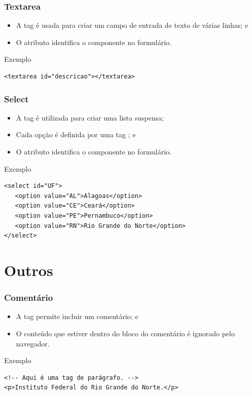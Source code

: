 \documentclass[aspectratio=169]{beamer} %
\begin{document}
\begin{frame}[fragile]
	\frametitle{Textarea}
	
	\begin{itemize}
		\item A tag  é usada para criar um campo de entrada de texto de várias linhas; e
		\item O atributo  identifica o componente no formulário.
	\end{itemize}\vfill
	
	\begin{exampleblock}{Exemplo}
		\begin{lstlisting}
<textarea id="descricao"></textarea>
		\end{lstlisting}
	\end{exampleblock}
\end{frame}

\begin{frame}[fragile]
	\frametitle{Select}
	
	\begin{itemize}
		\item A tag  é utilizada para criar uma lista suspensa;
		\item Cada opção é definida por uma tag ; e
		\item O atributo  identifica o componente no formulário.
	\end{itemize}\vfill
	
	\begin{exampleblock}{Exemplo}
		\begin{lstlisting}
<select id="UF">
   <option value="AL">Alagoas</option>
   <option value="CE">Ceará</option>
   <option value="PE">Pernambuco</option>
   <option value="RN">Rio Grande do Norte</option>
</select>
		\end{lstlisting}
	\end{exampleblock}
\end{frame}

\section{Outros}

\begin{frame}[fragile]
	\frametitle{Comentário}
	
	\begin{itemize}
		\item A tag \structure{<!- - ~~ - ->} permite incluir um comentário; e
		\item \alert{O conteúdo que estiver dentro do bloco do comentário é ignorado pelo navegador.}
	\end{itemize}\vfill
	
	\begin{exampleblock}{Exemplo}
		\begin{lstlisting}
<!-- Aqui é uma tag de parágrafo. -->
<p>Instituto Federal do Rio Grande do Norte.</p>
		\end{lstlisting}
	\end{exampleblock}
\end{frame}
\end{document}

